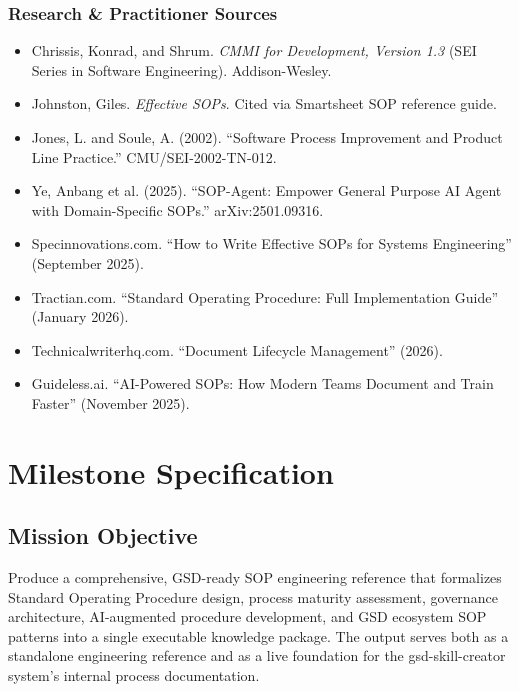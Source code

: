 \documentclass[11pt,letterpaper]{article}
\newcommand{\stageheader}[2]{%
  \noindent\colorbox{#2}{\makebox[\textwidth][l]{%
    \textcolor{white}{\bfseries\sffamily\hspace{6pt}#1\hspace{6pt}}}}%
  \vspace{0.5em}\par%
}
\begin{document}
\subsubsection{Research \& Practitioner Sources}
\begin{itemize}[leftmargin=1.5em]
  \item Chrissis, Konrad, and Shrum. \textit{CMMI for Development, Version 1.3} (SEI Series in Software Engineering). Addison-Wesley.
  \item Johnston, Giles. \textit{Effective SOPs}. Cited via Smartsheet SOP reference guide.
  \item Jones, L. and Soule, A. (2002). ``Software Process Improvement and Product Line Practice.'' CMU/SEI-2002-TN-012.
  \item Ye, Anbang et al. (2025). ``SOP-Agent: Empower General Purpose AI Agent with Domain-Specific SOPs.'' arXiv:2501.09316.
  \item Specinnovations.com. ``How to Write Effective SOPs for Systems Engineering'' (September 2025).
  \item Tractian.com. ``Standard Operating Procedure: Full Implementation Guide'' (January 2026).
  \item Technicalwriterhq.com. ``Document Lifecycle Management'' (2026).
  \item Guideless.ai. ``AI-Powered SOPs: How Modern Teams Document and Train Faster'' (November 2025).
\end{itemize}

\newpage

\stageheader{STAGE 3 --- MISSION PACKAGE}{tertiary}

\section{Milestone Specification}

\subsection{Mission Objective}

Produce a comprehensive, GSD-ready SOP engineering reference that formalizes Standard Operating Procedure design, process maturity assessment, governance architecture, AI-augmented procedure development, and GSD ecosystem SOP patterns into a single executable knowledge package. The output serves both as a standalone engineering reference and as a live foundation for the gsd-skill-creator system's internal process documentation.
\end{document}

